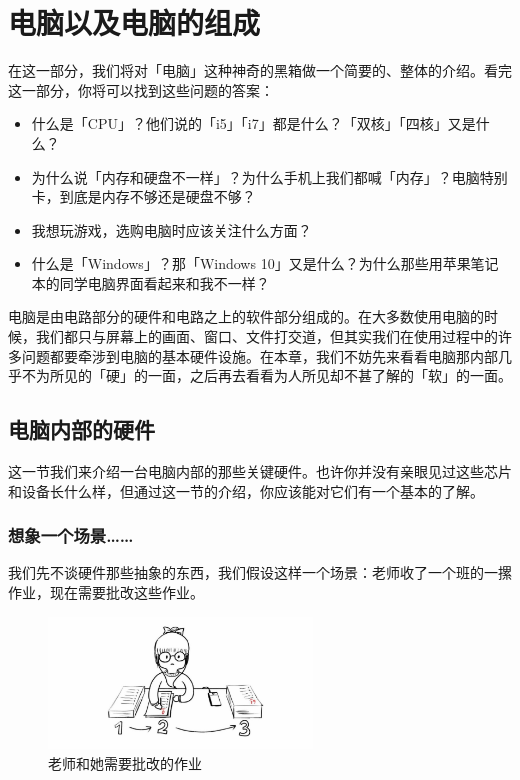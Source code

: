 \chapter{电脑以及电脑的组成}
\label{computer-and-its-components}

\begin{intro}
  在这一部分，我们将对「电脑」这种神奇的黑箱做一个简要的、整体的介绍。看完这一部分，你将可以找到这些问题的答案：

  \begin{itemize}
    \item 什么是「CPU」？他们说的「i5」「i7」都是什么？「双核」「四核」又是什么？
    \item 为什么说「内存和硬盘不一样」？为什么手机上我们都喊「内存」？电脑特别卡，到底是内存不够还是硬盘不够？
    \item 我想玩游戏，选购电脑时应该关注什么方面？
    \item 什么是「Windows」？那「Windows 10」又是什么？为什么那些用苹果笔记本的同学电脑界面看起来和我不一样？
  \end{itemize}
\end{intro}

电脑是由电路部分的硬件和电路之上的软件部分组成的。在大多数使用电脑的时候，我们都只与屏幕上的画面、窗口、文件打交道，但其实我们在使用过程中的许多问题都要牵涉到电脑的基本硬件设施。在本章，我们不妨先来看看电脑那内部几乎不为所见的「硬」的一面，之后再去看看为人所见却不甚了解的「软」的一面。

\section{电脑内部的硬件} 

这一节我们来介绍一台电脑内部的那些关键硬件。也许你并没有亲眼见过这些芯片和设备长什么样，但通过这一节的介绍，你应该能对它们有一个基本的了解。

\subsection{想象一个场景……}

我们先不谈硬件那些抽象的东西，我们假设这样一个场景：老师收了一个班的一摞作业，现在需要批改这些作业。

\begin{figure}[htb!]
  \centering
  \includegraphics[width=7cm]{assets/Teacher_and_homework.jpg}
  \caption{老师和她需要批改的作业}
  \label{teacher-and-homework}
\end{figure}

